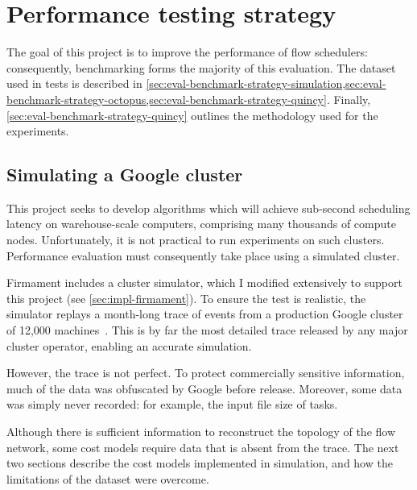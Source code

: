 \section{Performance testing strategy} \label{sec:eval-benchmark-strategy}

The goal of this project is to improve the performance of flow schedulers: consequently, benchmarking forms the majority of this evaluation. The dataset used in tests is described in \cref{sec:eval-benchmark-strategy-simulation,sec:eval-benchmark-strategy-octopus,sec:eval-benchmark-strategy-quincy}. Finally, \cref{sec:eval-benchmark-strategy-quincy} outlines the methodology used for the experiments.

\subsection{Simulating a Google cluster} \label{sec:eval-benchmark-strategy-simulation}

This project seeks to develop algorithms which will achieve sub-second scheduling latency on warehouse-scale computers, comprising many thousands of compute nodes. Unfortunately, it is not practical to run experiments on such clusters. Performance evaluation must consequently take place using a simulated cluster\footnotemark.

Firmament includes a cluster simulator, which I modified extensively to support this project (see \cref{sec:impl-firmament}). To ensure the test is realistic, the simulator replays a month-long trace of events from a production Google cluster of 12,000 machines~\cite{clusterdata:Wilkes2011,clusterdata:Reiss2011,Reiss:2012}. This is by far the most detailed trace released by any major cluster operator, enabling an accurate simulation.

However, the trace is not perfect. To protect commercially sensitive information, much of the data was obfuscated by Google before release. Moreover, some data was simply never recorded: for example, the input file size of tasks. 

Although there is sufficient information to reconstruct the topology of the flow network, some cost models require data that is absent from the trace. The next two sections describe the cost models implemented in simulation, and how the limitations of the dataset were overcome.

